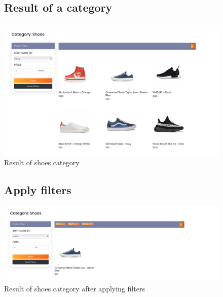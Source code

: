 \documentclass[11pt]{article}
\begin{document}
\begin{figure}[ht!]
    \subsection{Result of a category}
    \centering
    \includegraphics[width=\textwidth,height=3\paperheight,keepaspectratio]{Diagrams/External_Interfaces/Categories.png}
    \caption{Result of shoes category}
    \label{fig: Result of a category}
\end{figure}
\FloatBarrier

\begin{figure}[ht!]
    \subsection{Apply filters}
    \centering
    \includegraphics[width=\textwidth,height=0.3\paperheight,keepaspectratio]{Diagrams/External_Interfaces/Categories_filtered.png}
    \caption{Result of shoes category after applying filters}
    \label{fig: Apply filters}
\end{figure}
\FloatBarrier
\end{document}
